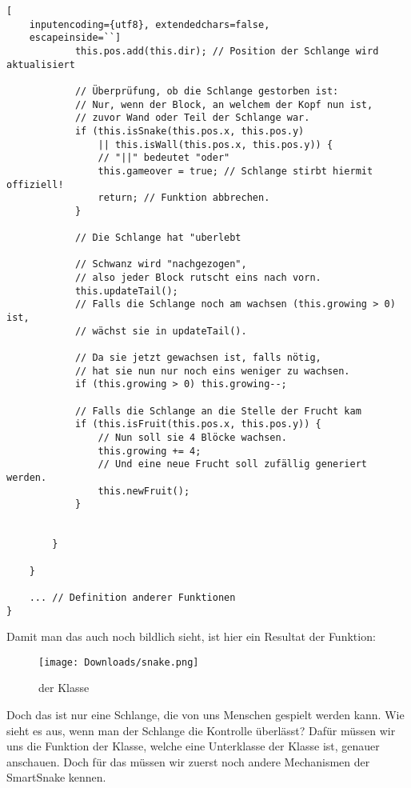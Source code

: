 \documentclass[10pt,a4paper,ngerman,english]{article}
\begin{document}
\begin{lstlisting}[
    inputencoding={utf8}, extendedchars=false,  
    escapeinside=``]
            this.pos.add(this.dir); // Position der Schlange wird aktualisiert

            // Überprüfung, ob die Schlange gestorben ist:
            // Nur, wenn der Block, an welchem der Kopf nun ist, 
            // zuvor Wand oder Teil der Schlange war.
            if (this.isSnake(this.pos.x, this.pos.y) 
                || this.isWall(this.pos.x, this.pos.y)) { 
                // "||" bedeutet "oder"
                this.gameover = true; // Schlange stirbt hiermit offiziell!
                return; // Funktion abbrechen.
            }

            // Die Schlange hat "uberlebt

            // Schwanz wird "nachgezogen", 
            // also jeder Block rutscht eins nach vorn.
            this.updateTail(); 
            // Falls die Schlange noch am wachsen (this.growing > 0) ist, 
            // wächst sie in updateTail().

            // Da sie jetzt gewachsen ist, falls nötig, 
            // hat sie nun nur noch eins weniger zu wachsen.
            if (this.growing > 0) this.growing--; 

            // Falls die Schlange an die Stelle der Frucht kam
            if (this.isFruit(this.pos.x, this.pos.y)) {
                // Nun soll sie 4 Blöcke wachsen.
                this.growing += 4; 
                // Und eine neue Frucht soll zufällig generiert werden.
                this.newFruit(); 
            }


        }

    }

    ... // Definition anderer Funktionen
}
\end{lstlisting}

Damit man das auch noch bildlich sieht, ist hier ein Resultat der  Funktion:\\

\begin{figure}[h] 
    \begin{center}
        \texttt{[image: Downloads/snake.png]}
        \caption{ der Klasse }
    \end{center}
\end{figure}

Doch das ist nur eine Schlange, die von uns Menschen gespielt werden kann. Wie sieht es aus, wenn man der Schlange die Kontrolle überlässt? Dafür müssen wir uns die  Funktion der  Klasse, welche eine Unterklasse der  Klasse ist, genauer anschauen. Doch für das müssen wir zuerst noch andere Mechanismen der SmartSnake kennen.
\end{document}
